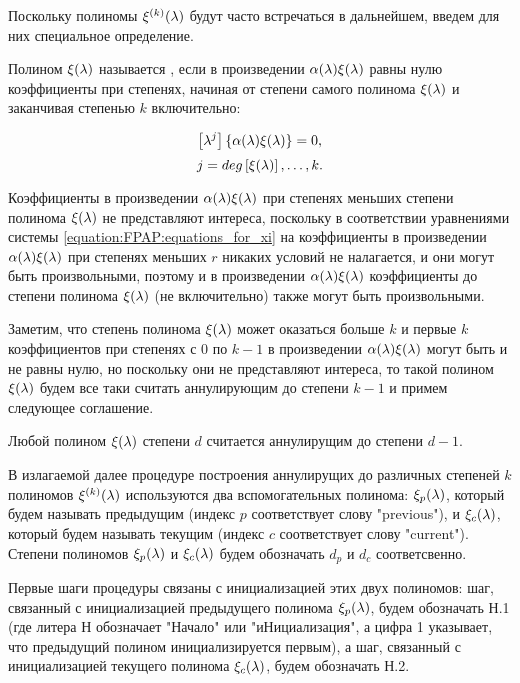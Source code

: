 Поскольку полиномы $\xi^{(k)} (\lambda)$ будут часто встречаться в дальнейшем, введем для них специальное определение.

\begin{definition}
	Полином $\xi (\lambda)$ называется , если в произведении
	$\alpha (\lambda) \xi (\lambda)$ равны нулю коэффициенты при степенях, начиная от степени самого полинома $\xi (\lambda)$
	и заканчивая степенью $k$ включительно:

		$$ \left [ \lambda^{j} \right ] \left \{ \alpha (\lambda) \xi (\lambda) \right \} = 0, $$
		$$ j = deg \left [ \xi (\lambda) \right ], \dots, k. $$
\end{definition}

Коэффициенты в произведении $\alpha (\lambda) \xi (\lambda)$ при степенях меньших степени полинома $\xi (\lambda)$ не
представляют интереса, поскольку в соответствии уравнениями системы \eqref{equation:FPAP:equations_for_xi} на коэффициенты в произведении
$\alpha (\lambda) \xi (\lambda)$ при степенях меньших $r$ никаких условий не налагается, и они могут быть произвольными, поэтому и в
произведении $\alpha (\lambda) \xi (\lambda)$ коэффициенты до степени полинома $\xi (\lambda)$ (не включительно) также могут
быть произвольными.

Заметим, что степень полинома $\xi (\lambda)$ может оказаться больше $k$ и первые $k$ коэффициентов при степенях с 0 по $k-1$ в произведении
$\alpha (\lambda) \xi (\lambda)$ могут быть и не равны нулю, но поскольку они не представляют интереса, то такой полином $\xi (\lambda)$
будем все таки считать аннулирующим до степени $k-1$ и примем следующее соглашение.

\begin{agreement} \label{agreement:FPAP:ignoring_nonzero_product_coefficients}
	Любой полином $\xi (\lambda)$ степени $d$ считается аннулирущим до степени $d-1$.
\end{agreement}

В излагаемой далее процедуре построения аннулирущих до различных степеней $k$ полиномов $\xi^{(k)} (\lambda)$ используются два вспомогательных
полинома: $\xi_p (\lambda)$, который будем называть предыдущим (индекс $p$ соответствует слову "previous"{}), и $\xi_c (\lambda)$, который
будем называть текущим (индекс $c$ соответствует слову "current"{}). Степени полиномов $\xi_p (\lambda)$ и $\xi_c (\lambda)$ будем обозначать
$d_p$ и $d_c$ соответсвенно.

Первые шаги процедуры связаны с инициализацией этих двух полиномов: шаг, связанный с инициализацией предыдущего полинома $\xi_p (\lambda)$,
будем обозначать Н.1 (где литера Н обозначает "Начало"{} или "иНициализация"{}, а цифра 1 указывает, что предыдущий полином инициализируется
первым), а шаг, связанный с инициализацией текущего полинома $\xi_c (\lambda)$, будем обозначать Н.2.

